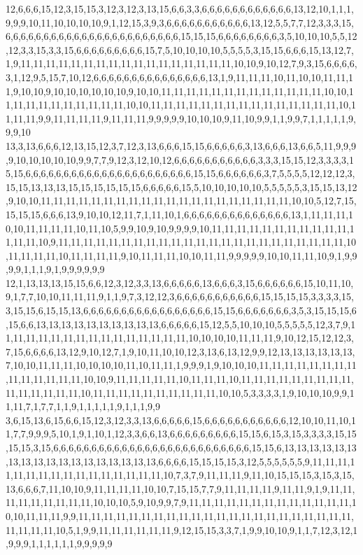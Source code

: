 12,6,6,6,15,12,3,15,15,3,12,3,12,3,13,15,6,6,3,3,6,6,6,6,6,6,6,6,6,6,6,6,13,12,10,1,1,1,9,9,9,10,11,10,10,10,10,9,1,12,15,3,9,3,6,6,6,6,6,6,6,6,6,6,6,13,12,5,5,7,7,12,3,3,3,15,6,6,6,6,6,6,6,6,6,6,6,6,6,6,6,6,6,6,6,6,6,6,6,15,15,15,6,6,6,6,6,6,6,6,3,5,10,10,10,5,5,12,12,3,3,15,3,3,15,6,6,6,6,6,6,6,6,6,15,7,5,10,10,10,10,5,5,5,5,3,15,15,6,6,6,15,13,12,7,1,9,11,11,11,11,11,11,11,11,11,11,11,11,11,11,11,11,11,10,10,9,10,12,7,9,3,15,6,6,6,6,3,1,12,9,5,15,7,10,12,6,6,6,6,6,6,6,6,6,6,6,6,6,6,6,13,1,9,11,11,11,10,11,10,10,11,11,11,9,10,10,9,10,10,10,10,10,10,9,10,10,11,11,11,11,11,11,11,11,11,11,11,11,11,10,10,11,11,11,11,11,11,11,11,11,11,10,10,11,11,11,11,11,11,11,11,11,11,11,11,11,11,11,10,11,11,11,9,9,11,11,11,11,9,11,11,11,9,9,9,9,9,10,10,10,9,11,10,9,9,1,1,9,9,7,1,1,1,1,1,9,9,9,10
13,3,13,6,6,6,12,13,15,12,3,7,12,3,13,6,6,6,15,15,6,6,6,6,6,3,13,6,6,6,13,6,6,5,11,9,9,9,9,10,10,10,10,10,9,9,7,7,9,12,3,12,10,12,6,6,6,6,6,6,6,6,6,6,6,3,3,3,15,15,12,3,3,3,3,15,15,6,6,6,6,6,6,6,6,6,6,6,6,6,6,6,6,6,6,6,6,6,6,15,15,6,6,6,6,6,6,3,7,5,5,5,5,12,12,12,3,15,15,13,13,13,15,15,15,15,15,15,6,6,6,6,6,15,5,10,10,10,10,10,5,5,5,5,5,3,15,15,13,12,9,10,10,11,11,11,11,11,11,11,11,11,11,11,11,11,11,11,11,11,11,11,11,10,10,5,12,7,15,15,15,15,6,6,6,13,9,10,10,12,11,7,1,11,10,1,6,6,6,6,6,6,6,6,6,6,6,6,6,6,13,1,11,11,11,10,10,11,11,11,11,10,11,10,5,9,9,10,9,10,9,9,9,9,10,11,11,11,11,11,11,11,11,11,11,11,11,11,11,10,9,11,11,11,11,11,11,11,11,11,11,11,11,11,11,11,11,11,11,11,11,11,11,11,10,11,11,11,11,10,11,11,11,11,9,10,11,11,11,10,10,11,11,9,9,9,9,9,10,10,11,11,10,9,1,9,9,9,9,1,1,1,9,1,9,9,9,9,9,9
12,1,13,13,13,15,15,6,6,12,3,12,3,3,13,6,6,6,6,6,13,6,6,6,3,15,6,6,6,6,6,6,15,10,11,10,9,1,7,7,10,10,11,11,11,9,1,1,9,7,3,12,12,3,6,6,6,6,6,6,6,6,6,6,6,15,15,15,15,3,3,3,3,15,3,15,15,6,15,15,13,6,6,6,6,6,6,6,6,6,6,6,6,6,6,6,6,6,15,15,6,6,6,6,6,6,6,3,5,3,15,15,15,6,15,6,6,13,13,13,13,13,13,13,13,13,13,6,6,6,6,6,15,12,5,5,10,10,10,5,5,5,5,5,12,3,7,9,11,11,11,11,11,11,11,11,11,11,11,11,11,11,11,10,10,10,10,11,11,11,9,10,12,15,12,12,3,7,15,6,6,6,6,13,12,9,10,12,7,1,9,10,11,10,10,12,3,13,6,13,12,9,9,12,13,13,13,13,13,13,7,10,10,11,11,11,10,10,10,10,11,10,11,11,1,9,9,9,1,9,10,10,10,11,11,11,11,11,11,11,11,11,11,11,11,11,11,10,10,9,11,11,11,11,11,10,11,11,11,10,11,11,11,11,11,11,11,11,11,11,11,11,11,11,11,10,11,11,11,11,11,11,11,11,11,11,10,10,5,3,3,3,3,1,9,10,10,10,9,9,11,11,7,1,7,7,1,1,9,1,1,1,1,1,9,1,1,1,9,9
3,6,15,13,6,15,6,6,15,12,3,12,3,3,13,6,6,6,6,6,15,6,6,6,6,6,6,6,6,6,6,6,12,10,10,11,10,11,7,7,9,9,9,5,10,1,9,1,10,1,12,3,3,6,6,13,6,6,6,6,6,6,6,6,6,15,15,6,15,3,15,3,3,3,3,15,15,15,15,3,15,6,6,6,6,6,6,6,6,6,6,6,6,6,6,6,6,6,6,6,6,6,6,6,6,6,6,15,15,6,13,13,13,13,13,13,13,13,13,13,13,13,13,13,13,13,13,13,6,6,6,6,15,15,15,15,3,12,5,5,5,5,5,5,9,11,11,11,11,11,11,11,11,11,11,11,11,11,11,11,11,10,7,3,7,9,11,11,11,9,11,10,15,15,15,3,15,3,15,13,6,6,6,7,11,10,10,9,11,11,11,11,10,10,7,15,15,7,7,9,11,11,11,11,9,11,11,9,1,9,11,11,11,11,11,11,11,11,11,10,10,10,5,9,10,9,9,7,9,11,11,11,11,11,11,11,11,11,11,11,11,11,10,10,11,11,11,9,9,11,11,11,11,11,11,11,11,11,11,11,11,11,11,11,11,11,11,11,11,11,11,11,11,11,11,10,5,1,9,9,11,11,11,11,11,11,9,12,15,15,3,3,7,1,9,9,10,10,9,1,1,7,12,3,12,1,9,9,9,1,1,1,1,1,1,9,9,9,9,9
